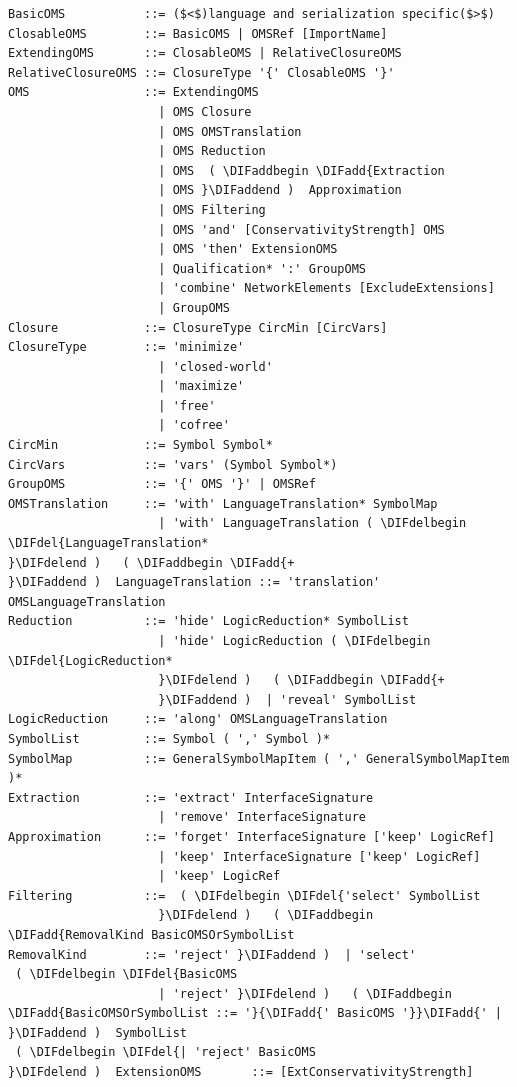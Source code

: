\documentclass[10pt,fleqn,final]{scrreprt}
\newenvironment{definitions}[0]{\medskip }{}
\providecommand{\DIFadd}[1]{{\protect\color{blue}\uwave{#1}}} %
\providecommand{\DIFdel}[1]{{\protect\color{red}\sout{#1}}}                      %
\providecommand{\DIFaddbegin}{} %
\providecommand{\DIFaddend}{} %
\providecommand{\DIFdelbegin}{} %
\providecommand{\DIFdelend}{} %
\begin{document}
\begin{definitions}
\begin{lstlisting}[language=ebnf,escapeinside={()},mathescape]
BasicOMS           ::= ($<$)language and serialization specific($>$) 
ClosableOMS        ::= BasicOMS | OMSRef [ImportName]
ExtendingOMS       ::= ClosableOMS | RelativeClosureOMS
RelativeClosureOMS ::= ClosureType '{' ClosableOMS '}'
OMS                ::= ExtendingOMS
                     | OMS Closure
                     | OMS OMSTranslation
                     | OMS Reduction
                     | OMS  ( \DIFaddbegin \DIFadd{Extraction
                     | OMS }\DIFaddend )  Approximation
                     | OMS Filtering
                     | OMS 'and' [ConservativityStrength] OMS
                     | OMS 'then' ExtensionOMS
                     | Qualification* ':' GroupOMS
                     | 'combine' NetworkElements [ExcludeExtensions]
                     | GroupOMS
Closure            ::= ClosureType CircMin [CircVars]
ClosureType        ::= 'minimize'
                     | 'closed-world'
                     | 'maximize'
                     | 'free'
                     | 'cofree'
CircMin            ::= Symbol Symbol*
CircVars           ::= 'vars' (Symbol Symbol*)
GroupOMS           ::= '{' OMS '}' | OMSRef
OMSTranslation     ::= 'with' LanguageTranslation* SymbolMap
                     | 'with' LanguageTranslation ( \DIFdelbegin \DIFdel{LanguageTranslation*
}\DIFdelend )   ( \DIFaddbegin \DIFadd{+
}\DIFaddend )  LanguageTranslation ::= 'translation' OMSLanguageTranslation
Reduction          ::= 'hide' LogicReduction* SymbolList
                     | 'hide' LogicReduction ( \DIFdelbegin \DIFdel{LogicReduction*
                     }\DIFdelend )   ( \DIFaddbegin \DIFadd{+
                     }\DIFaddend )  | 'reveal' SymbolList
LogicReduction     ::= 'along' OMSLanguageTranslation
SymbolList         ::= Symbol ( ',' Symbol )*
SymbolMap          ::= GeneralSymbolMapItem ( ',' GeneralSymbolMapItem )*
Extraction         ::= 'extract' InterfaceSignature
                     | 'remove' InterfaceSignature
Approximation      ::= 'forget' InterfaceSignature ['keep' LogicRef]
                     | 'keep' InterfaceSignature ['keep' LogicRef]
                     | 'keep' LogicRef
Filtering          ::=  ( \DIFdelbegin \DIFdel{'select' SymbolList
                     }\DIFdelend )   ( \DIFaddbegin \DIFadd{RemovalKind BasicOMSOrSymbolList
RemovalKind        ::= 'reject' }\DIFaddend )  | 'select'
 ( \DIFdelbegin \DIFdel{BasicOMS
                     | 'reject' }\DIFdelend )   ( \DIFaddbegin \DIFadd{BasicOMSOrSymbolList ::= '}{\DIFadd{' BasicOMS '}}\DIFadd{' | }\DIFaddend )  SymbolList
 ( \DIFdelbegin \DIFdel{| 'reject' BasicOMS
}\DIFdelend )  ExtensionOMS       ::= [ExtConservativityStrength]

\end{lstlisting}
\end{definitions}
\end{document}
